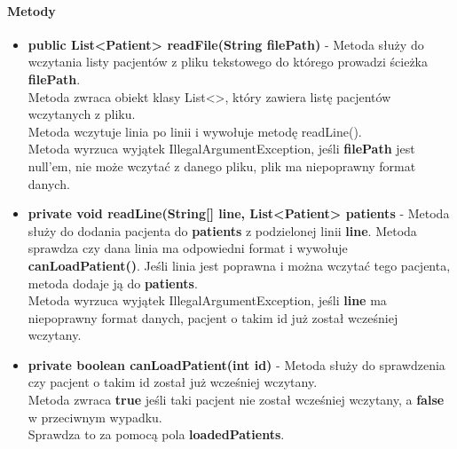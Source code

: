 \documentclass[]{article}
\begin{document}
                \paragraph{Metody}
                    \begin{itemize}
                        \item \textbf{public List<Patient> readFile(String filePath)} - 
                            Metoda służy do wczytania listy pacjentów z pliku tekstowego do którego prowadzi ścieżka \textbf{filePath}.\\
                            Metoda zwraca obiekt klasy List<>, który zawiera listę pacjentów wczytanych z pliku.\\
                            Metoda wczytuje linia po linii i wywołuje metodę readLine().\\
                            Metoda wyrzuca wyjątek IllegalArgumentException, jeśli
                                \textbf{filePath} jest null'em,
                                nie może wczytać z danego pliku,
                                plik ma niepoprawny format danych.
                        
                        \item \textbf{private void readLine(String[] line, List<Patient> patients} - 
                            Metoda służy do dodania pacjenta do \textbf{patients} z podzielonej linii \textbf{line}.
                            Metoda sprawdza czy dana linia ma odpowiedni format i wywołuje \textbf{canLoadPatient()}.
                            Jeśli linia jest poprawna i można wczytać tego pacjenta, metoda dodaje ją do \textbf{patients}.\\
                            Metoda wyrzuca wyjątek IllegalArgumentException, jeśli
                                \textbf{line} ma niepoprawny format danych,
                                pacjent o takim id już został wcześniej wczytany.
                                
                        \item \textbf{private boolean canLoadPatient(int id)} - 
                            Metoda służy do sprawdzenia czy pacjent o takim id został już wcześniej wczytany.\\
                            Metoda zwraca \textbf{true} jeśli taki pacjent nie został wcześniej wczytany,
                            a \textbf{false} w przeciwnym wypadku.\\
                            Sprawdza to za pomocą pola \textbf{loadedPatients}.\\
                    \end{itemize}
        
\end{document}
